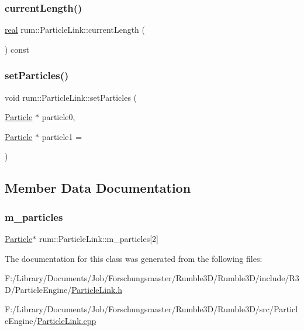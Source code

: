 \subsubsection{\texorpdfstring{current\+Length()}{currentLength()}}
{\footnotesize\ttfamily \hyperlink{namespacerum_a7e8cca23573d5eaead0f138cbaa4862c}{real} rum\+::\+Particle\+Link\+::current\+Length (\begin{DoxyParamCaption}{ }\end{DoxyParamCaption}) const\hspace{0.3cm}{\ttfamily [protected]}}

\mbox{\label{classrum_1_1_particle_link_a87021898f5a8ec8f5764c747c8117544}} 
\subsubsection{\texorpdfstring{set\+Particles()}{setParticles()}}
{\footnotesize\ttfamily void rum\+::\+Particle\+Link\+::set\+Particles (\begin{DoxyParamCaption}\item[{\hyperlink{classrum_1_1_particle}{Particle} $\ast$}]{particle0,  }\item[{\hyperlink{classrum_1_1_particle}{Particle} $\ast$}]{particle1 = {} }\end{DoxyParamCaption})}



\subsection{Member Data Documentation}
\mbox{\label{classrum_1_1_particle_link_a0a919ccae0b5813620d5010d49094dc7}} 
\subsubsection{\texorpdfstring{m\+\_\+particles}{m\_particles}}
{\footnotesize\ttfamily \hyperlink{classrum_1_1_particle}{Particle}$\ast$ rum\+::\+Particle\+Link\+::m\+\_\+particles\mbox{[}2\mbox{]}\hspace{0.3cm}{\ttfamily [protected]}}



The documentation for this class was generated from the following files\+:\begin{DoxyCompactItemize}
\item 
F\+:/\+Library/\+Documents/\+Job/\+Forschungsmaster/\+Rumble3\+D/\+Rumble3\+D/include/\+R3\+D/\+Particle\+Engine/\hyperlink{_particle_link_8h}{Particle\+Link.\+h}\item 
F\+:/\+Library/\+Documents/\+Job/\+Forschungsmaster/\+Rumble3\+D/\+Rumble3\+D/src/\+Particle\+Engine/\hyperlink{_particle_link_8cpp}{Particle\+Link.\+cpp}\end{DoxyCompactItemize}
